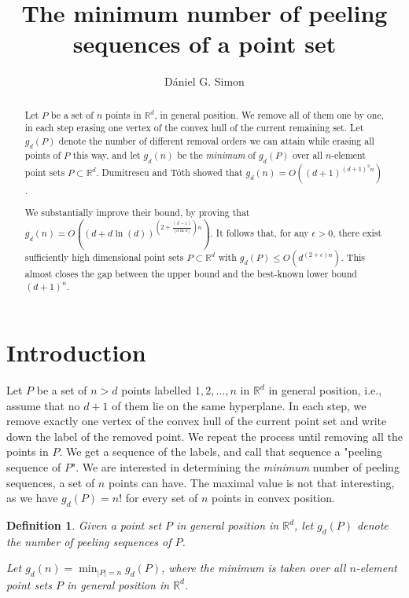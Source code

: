 \documentclass[a4paper,UKenglish,cleveref, autoref, thm-restate]{lipics-v2021}
\title{The minimum number of peeling sequences of a point set} %
\author{Dániel G. Simon}{Alfréd Rényi Institute of Mathematics, Budapest, Hungary, \\ Eötvös Loránd University, Budapest, Hungary}{dgsimon@renyi.hu}{https://orcid.org/0000-0002-3750-9666}{Research supported by ERC advanced grant no. 882971: Geoscape.}
\newtheorem*{definition*}{Definition}
\def\R{\mathbb{R}}
\begin{document}
\maketitle

\begin{abstract}
\linespread{1}\selectfont
 \noindent Let $P$ be a set of $n$ points in $\R^d$, in general position. We remove all of them one by one, in each step erasing one vertex of the convex hull of the current remaining set. Let $g_d(P)$ denote the number of different removal orders we can attain while erasing all points of $P$ this way, and let $g_d(n)$ be the \emph{minimum} of $g_d(P)$ over all $n$-element point sets $P\subset \R^d$. Dumitrescu and Tóth showed that $g_d(n)=O((d+1)^{(d+1)^2n})$. 
 
 We substantially improve their bound, by proving that $g_d(n)= O((d+d\ln{(d)})^{(2+\frac{(d-1)}{\lfloor d\ln{d}\rfloor})n})$. It follows that, for any $\epsilon>0$, there exist sufficiently high dimensional point sets $P\subset \R^d$ with $g_d(P)\leq O(d^{(2+\epsilon)n})$. This almost closes the gap between the upper bound and the best-known lower bound $(d+1)^n$.
\end{abstract}

\section{Introduction}

Let $P$ be a set of $n>d$ points labelled ${1,2,...,n}$ in $\R^d$ in general position, i.e., assume that no $d+1$ of them lie on the same hyperplane. In each step, we remove exactly one vertex of the convex hull of the current point set and write down the label of the removed point. We repeat the process until removing all the points in $P$. We get a sequence of the labels, and call that sequence a "peeling sequence of $P$". We are interested in determining the \emph{minimum} number of peeling sequences, a set of $n$ points can have. The maximal value is not that interesting, as we have $g_d(P)=n!$ for every set of $n$ points in convex position.

\begin{definition*}
Given a point set $P$ in general position in $\R^d$, let $g_d(P)$ denote the number of peeling sequences of $P$. 

Let 
$g_d(n)=\min_{|P|=n} g_d(P)$, where the minimum is taken over all $n$-element point sets $P$ in general position in $\R^d$.
\end{definition*}
\end{document}
